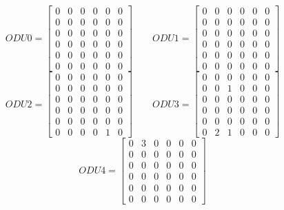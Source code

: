 \[
ODU0=
	\begin{bmatrix}
		0 & 0 & 0 & 0 & 0 & 0 \\
		0 & 0 & 0 & 0 & 0 & 0 \\
		0 & 0 & 0 & 0 & 0 & 0 \\
		0 & 0 & 0 & 0 & 0 & 0 \\
		0 & 0 & 0 & 0 & 0 & 0 \\
		0 & 0 & 0 & 0 & 0 & 0
	\end{bmatrix}
\qquad ODU1=
	\begin{bmatrix}
		0 & 0 & 0 & 0 & 0 & 0 \\
		0 & 0 & 0 & 0 & 0 & 0 \\
		0 & 0 & 0 & 0 & 0 & 0 \\
		0 & 0 & 0 & 0 & 0 & 0 \\
		0 & 0 & 0 & 0 & 0 & 0 \\
		0 & 0 & 0 & 0 & 0 & 0
	\end{bmatrix}
\]
\[
ODU2=
	\begin{bmatrix}
		0 & 0 & 0 & 0 & 0 & 0 \\
		0 & 0 & 0 & 0 & 0 & 0 \\
		0 & 0 & 0 & 0 & 0 & 0 \\
		0 & 0 & 0 & 0 & 0 & 0 \\
		0 & 0 & 0 & 0 & 0 & 0 \\
		0 & 0 & 0 & 0 & 1 & 0
	\end{bmatrix}
\qquad ODU3=
	\begin{bmatrix}
		0 & 0 & 0 & 0 & 0 & 0 \\
		0 & 0 & 1 & 0 & 0 & 0 \\
		0 & 0 & 0 & 0 & 0 & 0 \\
		0 & 0 & 0 & 0 & 0 & 0 \\
		0 & 0 & 0 & 0 & 0 & 0 \\
		0 & 2 & 1 & 0 & 0 & 0
	\end{bmatrix}
\]
\[
ODU4=
	\begin{bmatrix}
		0 & 3 & 0 & 0 & 0 & 0 \\
		0 & 0 & 0 & 0 & 0 & 0 \\
		0 & 0 & 0 & 0 & 0 & 0 \\
		0 & 0 & 0 & 0 & 0 & 0 \\
		0 & 0 & 0 & 0 & 0 & 0 \\
		0 & 0 & 0 & 0 & 0 & 0
	\end{bmatrix}
\]

